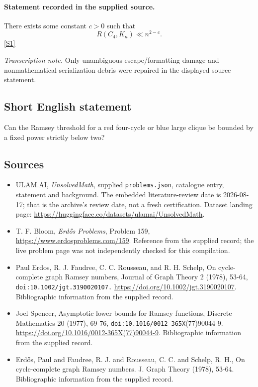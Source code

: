 \documentclass[11pt,a4paper]{article}
\newcommand{\sref}[2]{\hyperlink{source:#1:#2}{[S#2]}}
\begin{document}
\paragraph{Statement recorded in the supplied source.}
There exists some constant $c>0$ such that
\[R(C_4,K_n) \ll n^{2-c}.\] \sref{statement}{1}

{\small\emph{Transcription note.} Only unambiguous escape/formatting damage and nonmathematical serialization debris were repaired in the displayed source statement.}

\subsection{Short English statement}

Can the Ramsey threshold for a red four-cycle or blue large clique be bounded by a fixed power strictly below two?

\subsection{Sources}

{\small

\begin{itemize}

\item[\hypertarget{source:statement:1}{S1}] ULAM.AI, \emph{UnsolvedMath}, supplied \texttt{problems.json}, catalogue entry, statement and background. The embedded literature-review date is 2026-08-17; that is the archive’s review date, not a fresh certification. Dataset landing page: \url{https://huggingface.co/datasets/ulamai/UnsolvedMath}.

\item[\hypertarget{source:statement:2}{S2}] T. F. Bloom, \emph{Erdős Problems}, Problem 159, \url{https://www.erdosproblems.com/159}. Reference from the supplied record; the live problem page was not independently checked for this compilation.

\item[\hypertarget{source:statement:3}{S3}] Paul Erdos, R. J. Faudree, C. C. Rousseau, and R. H. Schelp, On cycle-complete graph Ramsey numbers, Journal of Graph Theory 2 (1978), 53-64, \nolinkurl{doi:10.1002/jgt.3190020107.} \url{https://doi.org/10.1002/jgt.3190020107}. Bibliographic information from the supplied record.

\item[\hypertarget{source:statement:4}{S4}] Joel Spencer, Asymptotic lower bounds for Ramsey functions, Discrete Mathematics 20 (1977), 69-76, \nolinkurl{doi:10.1016/0012-365X}(77)90044-9. \url{https://doi.org/10.1016/0012-365X(77)90044-9}. Bibliographic information from the supplied record.

\item[\hypertarget{source:statement:5}{S5}] Erd\H{o}s, Paul and Faudree, R. J. and Rousseau, C. C. and Schelp, R. H., On cycle-complete graph Ramsey numbers. J. Graph Theory (1978), 53-64. Bibliographic information from the supplied record.

\end{itemize}

}

\label{end:statement}
\end{document}
